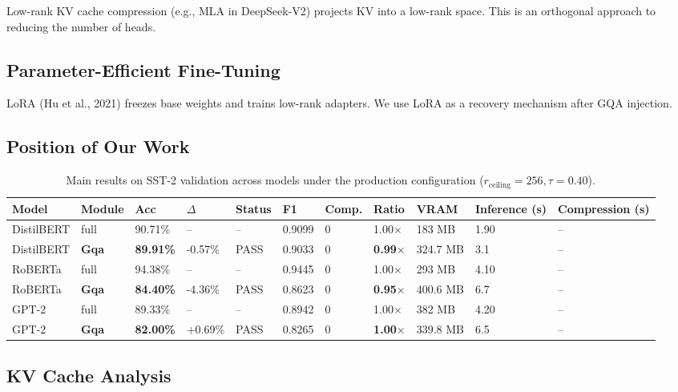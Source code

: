 Low-rank KV cache compression (e.g., MLA in DeepSeek-V2) projects KV into 
a low-rank space. This is an orthogonal approach to reducing the number of 
heads.

\subsection{Parameter-Efficient Fine-Tuning}

LoRA (Hu et al., 2021) freezes base weights and trains low-rank adapters. 
We use LoRA as a recovery mechanism after GQA injection.

\subsection{Position of Our Work}

\begin{table}[t]
\centering
\small
\begin{tabular}{lllllllllll}
\toprule
\textbf{Model} & \textbf{Module} & \textbf{Acc} & \textbf{$\Delta$} & \textbf{Status} & \textbf{F1} & \textbf{Comp.} & \textbf{Ratio} & \textbf{VRAM} & \textbf{Inference (s)} & \textbf{Compression (s)} \\
\midrule
DistilBERT & full & 90.71\% & -- & -- & 0.9099 & 0 & 1.00$\times$ & 183 MB & 1.90 & -- \\
DistilBERT & \textbf{Gqa} & \textbf{89.91\%} & -0.57\% & PASS & 0.9033 & 0 & \textbf{0.99$\times$} & 324.7 MB & 3.1 & -- \\
RoBERTa & full & 94.38\% & -- & -- & 0.9445 & 0 & 1.00$\times$ & 293 MB & 4.10 & -- \\
RoBERTa & \textbf{Gqa} & \textbf{84.40\%} & -4.36\% & PASS & 0.8623 & 0 & \textbf{0.95$\times$} & 400.6 MB & 6.7 & -- \\
GPT-2 & full & 89.33\% & -- & -- & 0.8942 & 0 & 1.00$\times$ & 382 MB & 4.20 & -- \\
GPT-2 & \textbf{Gqa} & \textbf{82.00\%} & +0.69\% & PASS & 0.8265 & 0 & \textbf{1.00$\times$} & 339.8 MB & 6.5 & -- \\
\bottomrule
\end{tabular}
\caption{Main results on SST-2 validation across models under the production configuration ($r_{\mathrm{ceiling}}=256, \tau=0.40$).}
\label{tab:main_sst2}
\end{table}

\subsection{KV Cache Analysis}

